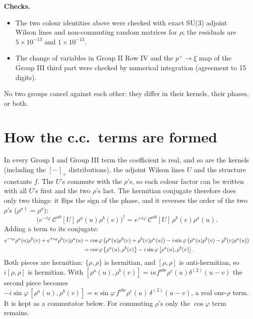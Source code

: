 \documentclass[10pt]{article}
\numberwithin{equation}{section}
\begin{document}
\noindent\textbf{Checks.}
\begin{itemize}
\item The two colour identities above were checked with exact SU(3) adjoint Wilson lines and non-commuting random matrices for $\rho$; the residuals are $5\times10^{-13}$ and $1\times10^{-13}$.
\item The change of variables in Group II Row IV and the $p^{+}\to\xi$ map of the Group III third part were checked by numerical integration (agreement to 15 digits).
\end{itemize}
No two groups cancel against each other: they differ in their kernels, their phases, or both.

\section{How the c.c.\ terms are formed}
In every Group I and Group III term the coefficient is real, and so are the kernels (including the $[\cdots]_{+}$ distributions), the adjoint Wilson lines $U$ and the structure constants $f$. The $U$'s commute with the $\rho$'s, so each colour factor can be written with all $U$'s first and the two $\rho$'s last. The hermitian conjugate therefore does only two things: it flips the sign of the phase, and it reverses the order of the two $\rho$'s ($\rho^{a\dagger}=\rho^{a}$):
\begin{equation}
\Big(e^{-i\varphi}\,\mathcal{C}^{ab}[U]\,\rho^{a}(u)\rho^{b}(v)\Big)^{\dagger}=e^{+i\varphi}\,\mathcal{C}^{ab}[U]\,\rho^{b}(v)\rho^{a}(u).
\end{equation}
Adding a term to its conjugate:
\begin{align}
e^{-i\varphi}\rho^{a}(u)\rho^{b}(v)+e^{+i\varphi}\rho^{b}(v)\rho^{a}(u)
&=\cos\varphi\,\big(\rho^{a}(u)\rho^{b}(v)+\rho^{b}(v)\rho^{a}(u)\big)-i\sin\varphi\,\big(\rho^{a}(u)\rho^{b}(v)-\rho^{b}(v)\rho^{a}(u)\big)\notag\\
&=\cos\varphi\,\big\{\rho^{a}(u),\rho^{b}(v)\big\}-i\sin\varphi\,\big[\rho^{a}(u),\rho^{b}(v)\big].\label{eq:comb}
\end{align}
Both pieces are hermitian: $\{\rho,\rho\}$ is hermitian, and $[\rho,\rho]$ is anti-hermitian, so $i[\rho,\rho]$ is hermitian. With $[\rho^{a}(u),\rho^{b}(v)]=i\kappa f^{abc}\rho^{c}(u)\delta^{(2)}(u-v)$ the second piece becomes $-i\sin\varphi\,[\rho^{a}(u),\rho^{b}(v)]=\kappa\sin\varphi\,f^{abc}\rho^{c}(u)\,\delta^{(2)}(u-v)$, a real one-$\rho$ term. It is kept as a commutator below. For commuting $\rho$'s only the $\cos\varphi$ term remains.
\end{document}
